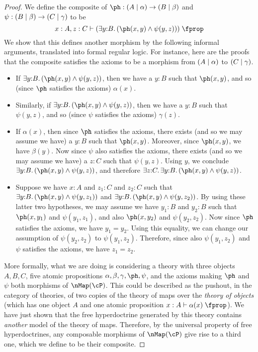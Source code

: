 \begin{wip}
\begin{proof}
  We define the composite of $\ph:(A\cb\alpha)\to (B\cb\beta)$ and $\psi:(B\mid\beta) \to (C\mid \gamma)$ to be
  \[ x:A,z:C \types (\exists y:B. (\ph(x,y) \meet \psi(y,z))) \prop \]
  We show that this defines another morphism by the following informal arguments, translated into formal regular logic.
  For instance, here are the proofs that the composite satisfies the axioms to be a morphism from $(A\mid \alpha)$ to $(C\mid\gamma)$.
  \begin{itemize}
  \item If $\exists y:B. (\ph(x,y) \meet \psi(y,z))$, then we have a $y:B$ such that $\ph(x,y)$, and so (since $\ph$ satisfies the axioms) $\alpha(x)$.
  \item Similarly, if $\exists y:B. (\ph(x,y) \meet \psi(y,z))$, then we have a $y:B$ such that $\psi(y,z)$, and so (since $\psi$ satisfies the axioms) $\gamma(z)$.
  \item If $\alpha(x)$, then since $\ph$ satisfies the axioms, there exists (and so we may assume we have) a $y:B$ such that $\ph(x,y)$.
    Moreover, since $\ph(x,y)$, we have $\beta(y)$.
    Now since $\psi$ also satisfies the axioms, there exists (and so we may assume we have) a $z:C$ such that $\psi(y,z)$.
    Using $y$, we conclude $\exists y:B.(\ph(x,y) \meet \psi(y,z))$, and therefore $\exists z:C.\exists y:B.(\ph(x,y) \meet \psi(y,z))$.
  \item Suppose we have $x:A$ and $z_1:C$ and $z_2:C$ such that $\exists y:B.(\ph(x,y) \meet \psi(y,z_1))$ and $\exists y:B.(\ph(x,y) \meet \psi(y,z_2))$.
    By using these latter two hypotheses, we may assume we have $y_1:B$ and $y_2:B$ such that $\ph(x,y_1)$ and $\psi(y_1,z_1)$, and also $\ph(x,y_2)$ and $\psi(y_2,z_2)$.
    Now since $\ph$ satisfies the axioms, we have $y_1=y_2$.
    Using this equality, we can change our assumption of $\psi(y_2,z_2)$ to $\psi(y_1,z_2)$.
    Therefore, since also $\psi(y_1,z_2)$ and $\psi$ satisfies the axioms, we have $z_1=z_2$.
  \end{itemize}
  More formally, what we are doing is considering a theory with three objects $A,B,C$, five atomic propositions $\alpha,\beta,\gamma,\ph,\psi$, and the axioms making $\ph$ and $\psi$ both morphisms of $\map(\cP)$.
  This could be described as the pushout, in the category of theories, of two copies of the theory of maps over the \emph{theory of objects} (which has one object $A$ and one atomic proposition $x:A \types \alpha(x)\prop$).
  We have just shown that the free hyperdoctrine generated by this theory contains \emph{another} model of the theory of maps.
  Therefore, by the universal property of free hyperdoctrines, any composable morphisms of $\map(\cP)$ give rise to a third one, which we define to be their composite.


\end{proof}
\end{wip}
